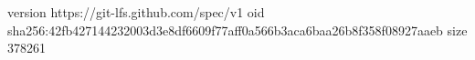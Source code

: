 version https://git-lfs.github.com/spec/v1
oid sha256:42fb427144232003d3e8df6609f77aff0a566b3aca6baa26b8f358f08927aaeb
size 378261
